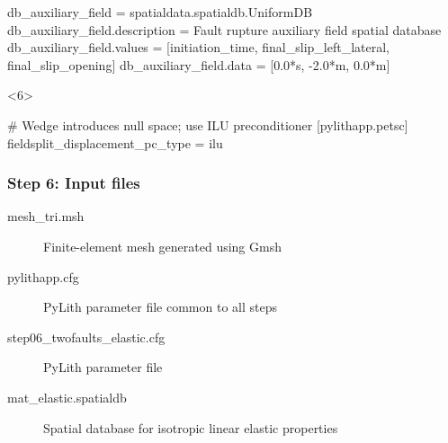 \documentclass[aspectratio=169]{beamer}
\begin{document}
\begin{frame}[t,fragile]
\begin{minipage}[t]{0.67\textwidth}
\begin{onlyenv}
\begin{cfgcode}
        db_auxiliary_field = spatialdata.spatialdb.UniformDB
        db_auxiliary_field.description = Fault rupture auxiliary field spatial database
        db_auxiliary_field.values = [initiation_time, final_slip_left_lateral, final_slip_opening]
        db_auxiliary_field.data = [0.0*s, -2.0*m, 0.0*m]
      \end{cfgcode}
    \end{onlyenv}
    \begin{onlyenv}<6>
      \begin{cfgcode}
        # Wedge introduces null space; use ILU preconditioner
        [pylithapp.petsc]
        fieldsplit_displacement_pc_type = ilu
      \end{cfgcode}
    \end{onlyenv}
  \end{minipage}

  
\end{frame}


\begin{frame}
  \frametitle{Step 6: Input files}
  \summary{}

  \begin{description}
  \item[mesh\_tri.msh] Finite-element mesh generated using Gmsh
  \item[pylithapp.cfg] PyLith parameter file common to all steps
  \item[step06\_twofaults\_elastic.cfg] PyLith parameter file
  \item[mat\_elastic.spatialdb] Spatial database for isotropic linear elastic properties
  \end{description}
    
\end{frame}
\end{document}
